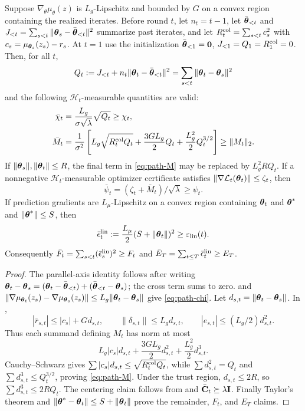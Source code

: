 \documentclass[twoside]{article}
\newcommand{\cHist}{\mathcal{H}}                %
\begin{document}
\begin{lemma}\label{lem:path-certificates}
Suppose $\nabla_\theta\mu_\theta(z)$ is $L_g$-Lipschitz and bounded by $G$
on a convex region containing the realized iterates.  Before round $t$, let
$n_t=t-1$, let $\bar{\boldsymbol{\theta}}_{<t}$ and
$J_{<t}=\sum_{s<t}\|\boldsymbol{\theta}_s-\bar{\boldsymbol{\theta}}_{<t}\|^2$ summarize past
iterates, and let
$R_t^{\rm col}=\sum_{s<t}c_s^2$ with
$c_s=\mu_{\boldsymbol{\theta}_s}(z_s)-r_s$.  At $t=1$ use the initialization
$\bar{\boldsymbol{\theta}}_{<1}=\mathbf0$, $J_{<1}=Q_1=R_1^{\rm col}=0$.  Then, for all $t$,
\[
 Q_t:=J_{<t}+n_t\|\boldsymbol{\theta}_t-\bar{\boldsymbol{\theta}}_{<t}\|^2
 =\sum_{s<t}\|\boldsymbol{\theta}_t-\boldsymbol{\theta}_s\|^2
\]
and the following $\cHist_t$-measurable quantities are valid:
\begin{align}
 \bar\chi_t&=\frac{L_g}{\sigma\sqrt\lambda}\sqrt{Q_t}\ge\chi_t,\label{eq:path-chi}\\
 \bar M_t&=\frac1{\sigma^2}\left[
 L_g\sqrt{R_t^{\rm col}Q_t}+\frac{3GL_g}{2}Q_t
 +\frac{L_g^2}{2}Q_t^{3/2}\right]\ge\|M_t\|_2.\label{eq:path-M}
\end{align}
If $\|\boldsymbol{\theta}_s\|,\|\boldsymbol{\theta}_t\|\le R$, the final term in
\eqref{eq:path-M} may be replaced by $L_g^2RQ_t$.  If a nonnegative
$\cHist_t$-measurable optimizer certificate satisfies
$\|\nabla\mathcal{L}_t(\boldsymbol{\theta}_t)\|\le\zeta_t$, then
\[
 \bar\psi_t=(\zeta_t+\bar M_t)/\sqrt\lambda\ge\psi_t.
\]
If prediction gradients are $L_\mu$-Lipschitz on a convex region containing
$\boldsymbol{\theta}_t$ and $\boldsymbol{\theta}^*$ and $\|\boldsymbol{\theta}^*\|\le S$, then
\[
 \bar\epsilon_t^{\rm lin}:=\frac{L_\mu}{2}(S+\|\boldsymbol{\theta}_t\|)^2
 \ge\varepsilon_{\mathrm{lin}}(t).
\]
Consequently
$\bar F_t=\sum_{s<t}(\bar\epsilon_s^{\rm lin})^2\ge F_t$ and
$\bar E_T=\sum_{t\le T}\bar\epsilon_t^{\rm lin}\ge E_T$.
\end{lemma}
\begin{proof}
The parallel-axis identity follows after writing
$\boldsymbol{\theta}_t-\boldsymbol{\theta}_s=(\boldsymbol{\theta}_t-\bar{\boldsymbol{\theta}}_{<t})
+(\bar{\boldsymbol{\theta}}_{<t}-\boldsymbol{\theta}_s)$; the cross term sums to zero.
 and
$\|\nabla\mu_{\boldsymbol{\theta}_t}(z_s)-\nabla\mu_{\boldsymbol{\theta}_s}(z_s)\|
\le L_g\|\boldsymbol{\theta}_t-\boldsymbol{\theta}_s\|$ give \eqref{eq:path-chi}.
Let $d_{s,t}=\|\boldsymbol{\theta}_t-\boldsymbol{\theta}_s\|$.  In
,
\[
 |\bar r_{s,t}|\le |c_s|+Gd_{s,t},\qquad
 \|\delta_{s,t}\|\le L_gd_{s,t},\qquad
 |e_{s,t}|\le(L_g/2)d_{s,t}^2.
\]
Thus each summand defining $M_t$ has norm at most
\[
 L_g|c_s|d_{s,t}+\frac{3GL_g}{2}d_{s,t}^2
 +\frac{L_g^2}{2}d_{s,t}^3.
\]
Cauchy--Schwarz gives
$\sum|c_s|d_{s,t}\le\sqrt{R_t^{\rm col}Q_t}$, while
$\sum d_{s,t}^2=Q_t$ and
$\sum d_{s,t}^3\le Q_t^{3/2}$, proving \eqref{eq:path-M}.
Under the trust region, $d_{s,t}\le2R$, so
$\sum d_{s,t}^3\le2RQ_t$.  The centering claim follows from
 and $\bar{\mathbf{C}}_t\succeq\lambda\mathbf{I}$.
Finally Taylor's theorem and
$\|\boldsymbol{\theta}^*-\boldsymbol{\theta}_t\|\le S+\|\boldsymbol{\theta}_t\|$ prove the remainder,
$F_t$, and $E_T$ claims.
\end{proof}
\end{document}
